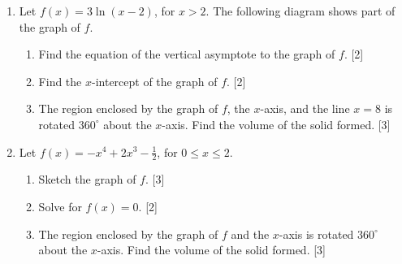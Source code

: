 \documentclass[12pt, twoside]{article}
\begin{document}
\begin{enumerate}
\item Let $f(x)=3\ln(x-2)$, for $x>2$. The following diagram shows part of the graph of $f$.
    \begin{center}
    \end{center}
  \begin{enumerate}
    \item Find the equation of the vertical asymptote to the graph of $f$. \hfill [2]
    \item Find the $x$-intercept of the graph of $f$. \hfill [2]
    \item The region enclosed by the graph of $f$, the $x$-axis, and the line $x=8$ is rotated $360^\circ$ about the $x$-axis. Find the volume of the solid formed.  \hfill [3]
  \end{enumerate}

\newpage

\item Let $f(x)=-x^4+2x^3-\frac{1}{2}$, for $0 \leq x \leq 2$.

  \begin{enumerate}
    \item Sketch the graph of $f$. \hfill [3]
      \begin{center}
      \end{center}
    \item Solve for $f(x)=0$. \hfill [2]
    \item The region enclosed by the graph of $f$ and the $x$-axis is rotated $360^\circ$ about the $x$-axis. Find the volume of the solid formed.  \hfill [3]
  \end{enumerate}


\end{enumerate}
\end{document}
